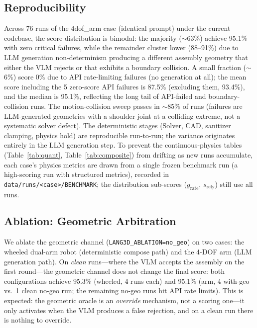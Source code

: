 \documentclass[conference]{IEEEtran}
\begin{document}
\subsection{Reproducibility}
\label{sec:reproducibility}
Across 76 runs of the 4dof\_arm case (identical prompt) under the current codebase, the score distribution is bimodal: the majority ($\sim$63\%) achieve 95.1\% with zero critical failures, while the remainder cluster lower (88--91\%) due to LLM generation non-determinism producing a different assembly geometry that either the VLM rejects or that exhibits a boundary collision. A small fraction ($\sim$6\%) score 0\% due to API rate-limiting failures (no generation at all); the mean score including the 5 zero-score API failures is 87.5\% (excluding them, 93.4\%), and the median is 95.1\%, reflecting the long tail of API-failed and boundary-collision runs. The motion-collision sweep passes in $\sim$85\% of runs (failures are LLM-generated geometries with a shoulder joint at a colliding extreme, not a systematic solver defect). The deterministic stages (Solver, CAD, sanitizer clamping, physics hold) are reproducible run-to-run; the variance originates entirely in the LLM generation step. To prevent the continuous-physics tables (Table~\ref{tab:quant}, Table~\ref{tab:composite}) from drifting as new runs accumulate, each case's physics metrics are drawn from a single frozen benchmark run (a high-scoring run with structured metrics), recorded in \texttt{data/runs/<case>/BENCHMARK}; the distribution sub-scores ($g_{\text{rate}}$, $s_{\text{rely}}$) still use all runs.

\subsection{Ablation: Geometric Arbitration}
We ablate the geometric channel (\texttt{LANG3D\_ABLATION=no\_geo}) on two cases: the wheeled dual-arm robot (deterministic compose path) and the 4-DOF arm (LLM generation path). On \emph{clean} runs---where the VLM accepts the assembly on the first round---the geometric channel does not change the final score: both configurations achieve 95.3\% (wheeled, 4 runs each) and 95.1\% (arm, 4 with-geo vs.\ 1 clean no-geo run; the remaining no-geo runs hit API rate limits). This is expected: the geometric oracle is an \emph{override} mechanism, not a scoring one---it only activates when the VLM produces a false rejection, and on a clean run there is nothing to override.
\end{document}

